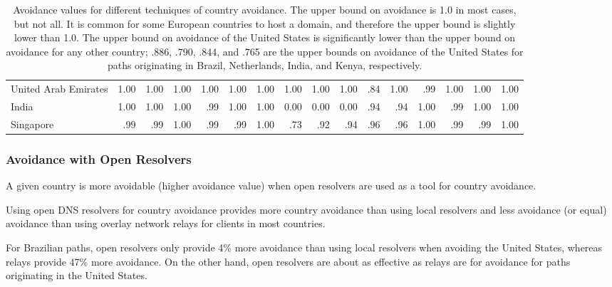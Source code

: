 \begin{table*}[t]
{\begin{tabular}{P{32mm}|d{3.2}d{3.2}d{3.2}|d{3.2}d{3.2}d{3.2}|d{3.2}d{3.2}d{3.2}|d{3.2}d{3.2}d{3.2}|d{3.2}d{3.2}d{3.2}}
United Arab Emirates &1.00  &1.00   &1.00     &1.00 &1.00 &1.00   &1.00 &1.00   &1.00  &.84 &1.00  &.99  &1.00 &1.00 &1.00  \\
India                &1.00  &1.00   &1.00     &.99 &1.00 &1.00   &0.00 &0.00   &0.00  &.94 &.94  &1.00  &.99 &1.00 &1.00  \\
Singapore            &.99  &.99   &1.00     &.99 &.99 &1.00   &.73  &.92  &.94  &.96 &.96  &1.00  &.99 &.99 &1.00  \\\midrule
\end{tabular}
}
\caption{Avoidance values for different techniques of country avoidance.  The upper bound on avoidance is 1.0 in most cases, but not all.  It is 
common for some European countries to host a domain, and therefore the upper bound is slightly lower than 1.0.  The upper bound on avoidance of the 
United States is significantly lower than the upper bound on avoidance for any other country; .886, .790, .844, and .765 are the upper bounds on avoidance 
of the United States for paths originating in Brazil, Netherlands, India, and Kenya, respectively.}
\label{tab:avoid}
\end{table*}

\subsubsection{Avoidance with Open Resolvers}
A given country is more avoidable (higher avoidance value) when open resolvers are used as a tool for country avoidance.

\begin{finding}
Using open DNS resolvers for country avoidance provides more country avoidance than using local resolvers and less avoidance (or equal) avoidance than using overlay network relays for clients in most countries.
\end{finding}

For Brazilian paths, open resolvers only provide 4\% more avoidance than using local resolvers when avoiding the United States, whereas relays provide 47\% more avoidance.  On the other hand, open resolvers are about as effective as relays are for avoidance for paths originating in the United States.  

